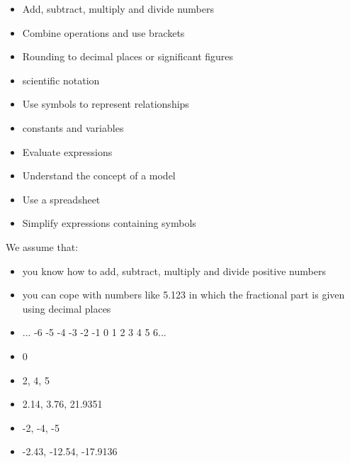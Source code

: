 \begin{frame}
  \begin{itemize}
  	\item Add, subtract, multiply and divide numbers
  	\item Combine operations and use brackets
  	\item Rounding to decimal places or significant figures
  	\item scientific notation
  	\item Use symbols to represent relationships
  	\item constants and variables
  	\item Evaluate expressions
  	\item Understand the concept of a model
  	\item Use a spreadsheet
  	\item Simplify expressions containing symbols
  \end{itemize}
\end{frame}
\begin{frame}
We assume  that:
\begin{itemize}

	\item you know how to add, subtract, multiply and divide positive numbers
	\item you can cope with numbers like 5.123 in which the fractional part is given using decimal places
\end{itemize}
\end{frame}
\begin{frame}
\begin{itemize}
\item ... -6  -5  -4  -3  -2  -1   0   1   2   3   4   5   6...
\item 0
\item 2, 4, 5
\item 2.14, 3.76, 21.9351
\item -2, -4, -5
\item -2.43, -12.54, -17.9136
\end{itemize}
\end{frame}
